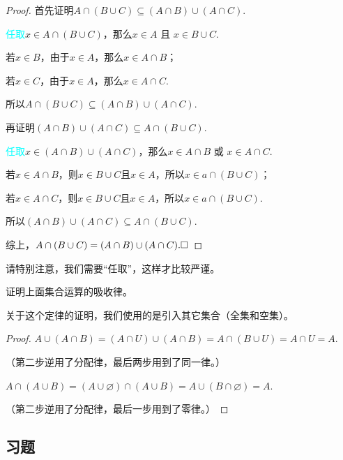 \documentclass[lang=cn,math=cm,chinesefont=nofont,11pt,scheme=chinese,onecol]{elegantbook}
\begin{document}
\begin{proof}
  首先证明$A\cap(B\cup C)\subseteq(A\cap B)\cup(A\cap C)$.

  \textcolor{cyan}{任取}\enspace$x\in A\cap(B\cup C)$，那么$x\in A\text{ 且 }x\in B\cup C$.

  若$x\in B$，由于$x\in A$，那么$x\in A\cap B$；

  若$x\in C$，由于$x\in A$，那么$x\in A\cap C$.

  所以$A\cap(B\cup C)\subseteq(A\cap B)\cup(A\cap C)$.

  \hspace*{\fill}

  再证明$(A\cap B)\cup(A\cap C)\subseteq A\cap(B\cup C)$.

  \textcolor{cyan}{任取}\enspace$x\in (A\cap B)\cup(A\cap C)$，那么$x\in A\cap B\text{ 或 }x\in A\cap C$.

  若$x\in A\cap B$，则$x\in B\cup C\text{且}x\in A$，所以$x\in a\cap(B\cup C)$；

  若$x\in A\cap C$，则$x\in B\cup C\text{且}x\in A$，所以$x\in a\cap(B\cup C)$.

  所以$(A\cap B)\cup(A\cap C)\subseteq A\cap(B\cup C)$.

  综上，$A\cap(B\cup C)=(A\cap B)\cup(A\cap C).\hfill\square$
\end{proof}
\begin{remark}
  请特别注意，我们需要“任取”，这样才比较严谨。
\end{remark}

\hspace*{\fill}

\begin{example}
  证明上面集合运算的吸收律。
\end{example}
关于这个定律的证明，我们使用的是引入其它集合（全集和空集）。

\begin{proof}
  $A\cup (A\cap B)=(A\cap U)\cup(A\cap B)=A\cap(B\cup U)=A\cap U=A.$

  （第二步逆用了分配律，最后两步用到了同一律。）

  $A\cap(A\cup B)=(A\cup\varnothing)\cap(A\cup B)=A\cup(B\cap\varnothing)=A.$

  （第二步逆用了分配律，最后一步用到了零律。）
\end{proof}

\subsection{习题}
\end{document}
